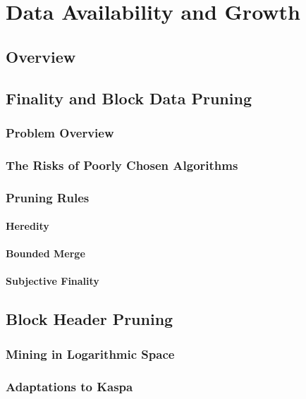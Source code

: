 \chapter{Data Availability and Growth}

\section{Overview}

\section{Finality and Block Data Pruning} 

\subsection{Problem Overview}

\subsection{The Risks of Poorly Chosen Algorithms}

\subsection{Pruning Rules}

\subsubsection*{Heredity}
\subsubsection*{Bounded Merge}
\subsubsection*{Subjective Finality}

\section{Block Header Pruning}

\subsection{Mining in Logarithmic Space}
\subsection{Adaptations to Kaspa}